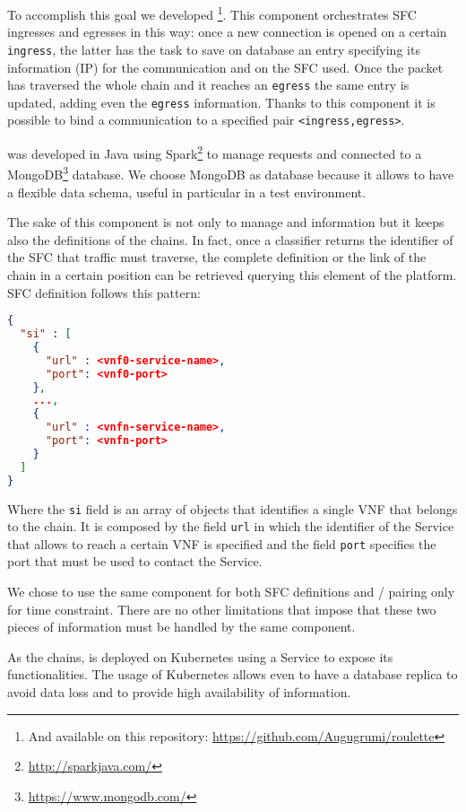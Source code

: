\noindent
To accomplish this goal we developed \roulette{}\footnote{And available on
this repository: \url{https://github.com/Augugrumi/roulette}}. This component
orchestrates SFC ingresses and egresses in this way: once a new connection is
opened on a certain \texttt{ingress}, the latter has the task to save on 
\roulette{} database an entry specifying its information (IP) for the
communication and on the SFC used. Once the packet has traversed the whole chain
and it reaches an \texttt{egress} the same entry is updated, adding even the 
\texttt{egress} information. Thanks to this component it is possible to bind a
communication to a specified pair \verb!<ingress,egress>!.

\roulette{} was developed in Java using
Spark\footnote{\url{http://sparkjava.com/}} to manage requests and
connected to a MongoDB\footnote{\url{https://www.mongodb.com/}} database. We
choose MongoDB as database because it allows to have a flexible data schema,
useful in particular in a test environment.

The sake of this component is not only to manage \ingresses{} and \egresses{}
information but it keeps also the definitions of the chains. In fact, once a
classifier returns the identifier of the SFC that traffic must traverse, the
complete definition or the link of the chain in a certain position can be
retrieved querying this element of the platform. SFC definition follows this
pattern:

\begin{lstlisting}[caption={Definition of an SFC on \roulette{}.}, captionpos=b,
                   language=json]
{
  "si" : [
    {
      "url" : <vnf0-service-name>,
      "port": <vnf0-port>
    },
    ...,
    {
      "url" : <vnfn-service-name>,
      "port": <vnfn-port>
    }
  ]
}
\end{lstlisting}

\noindent
Where the \texttt{si} field is an array of objects that identifies a single VNF
that belongs to the chain. It is composed by the field \texttt{url} in which the
identifier of the Service that allows to reach a certain VNF is specified and
the field \texttt{port} specifies the port that must be used to contact the
Service.

We chose to use the same component for both SFC definitions and 
\ingress{}/\egresses{} pairing only for time constraint. There are no other
limitations that impose that these two pieces of information must be handled by
the same component. 

As the chains, \roulette{} is deployed on Kubernetes using a Service to expose
its functionalities. The usage of Kubernetes allows even to have a database
replica to avoid data loss and to provide high availability of information.

